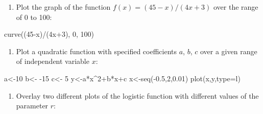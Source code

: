 \documentclass[
  letterpaper,
  DIV=11,
  numbers=noendperiod]{scrreprt}
\newenvironment{Shaded}{\begin{snugshade}}{\end{snugshade}}
\newcommand{\AttributeTok}[1]{\textcolor[rgb]{0.40,0.45,0.13}{#1}}
\newcommand{\DecValTok}[1]{\textcolor[rgb]{0.68,0.00,0.00}{#1}}
\newcommand{\FloatTok}[1]{\textcolor[rgb]{0.68,0.00,0.00}{#1}}
\newcommand{\FunctionTok}[1]{\textcolor[rgb]{0.28,0.35,0.67}{#1}}
\newcommand{\NormalTok}[1]{\textcolor[rgb]{0.00,0.23,0.31}{#1}}
\newcommand{\OtherTok}[1]{\textcolor[rgb]{0.00,0.23,0.31}{#1}}
\newcommand{\SpecialCharTok}[1]{\textcolor[rgb]{0.37,0.37,0.37}{#1}}
\newcommand{\StringTok}[1]{\textcolor[rgb]{0.13,0.47,0.30}{#1}}
\providecommand{\tightlist}{%
  \setlength{\itemsep}{0pt}\setlength{\parskip}{0pt}}\usepackage{longtable,booktabs,array}
\begin{document}
\begin{enumerate}
\def\labelenumi{\arabic{enumi}.}
\setcounter{enumi}{3}
\tightlist
\item
  Plot the graph of the function \(f(x) = (45-x)/(4x+3)\) over the range
  of 0 to 100:
\end{enumerate}

\begin{Shaded}
\begin{Highlighting}[]
\FunctionTok{curve}\NormalTok{((}\DecValTok{45}\SpecialCharTok{{-}}\NormalTok{x)}\SpecialCharTok{/}\NormalTok{(4x}\SpecialCharTok{+}\DecValTok{3}\NormalTok{), }\DecValTok{0}\NormalTok{, }\DecValTok{100}\NormalTok{)}
\end{Highlighting}
\end{Shaded}

\begin{enumerate}
\def\labelenumi{\arabic{enumi}.}
\setcounter{enumi}{4}
\tightlist
\item
  Plot a quadratic function with specified coefficients \(a\), \(b\),
  \(c\) over a given range of independent variable \(x\):
\end{enumerate}

\begin{Shaded}
\begin{Highlighting}[]
\NormalTok{a}\OtherTok{\textless{}{-}}\DecValTok{10}
\NormalTok{b}\OtherTok{\textless{}{-}} \SpecialCharTok{{-}}\DecValTok{15}
\NormalTok{c}\OtherTok{\textless{}{-}} \DecValTok{5}
\NormalTok{y}\OtherTok{\textless{}{-}}\NormalTok{a}\SpecialCharTok{*}\NormalTok{x}\SpecialCharTok{\^{}}\DecValTok{2}\SpecialCharTok{+}\NormalTok{b}\SpecialCharTok{*}\NormalTok{x}\SpecialCharTok{+}\NormalTok{c}
\NormalTok{x}\OtherTok{\textless{}{-}}\FunctionTok{seq}\NormalTok{(}\SpecialCharTok{{-}}\FloatTok{0.5}\NormalTok{,}\DecValTok{2}\NormalTok{,}\FloatTok{0.01}\NormalTok{) }
\FunctionTok{plot}\NormalTok{(x,y,}\AttributeTok{type=}\StringTok{\textquotesingle{}l\textquotesingle{}}\NormalTok{)}
\end{Highlighting}
\end{Shaded}

\begin{enumerate}
\def\labelenumi{\arabic{enumi}.}
\setcounter{enumi}{5}
\tightlist
\item
  Overlay two different plots of the logistic function with different
  values of the parameter \(r\):
\end{enumerate}
\end{document}

